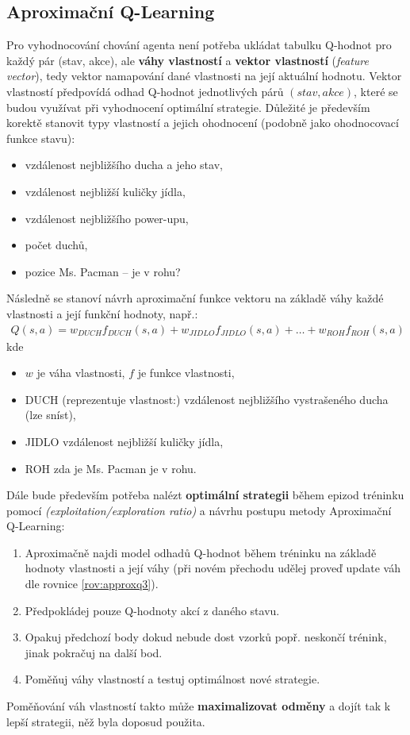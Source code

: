 \subsection*{Aproximační Q-Learning}
\label{navrh:approxqlearnagent}
Pro vyhodnocování chování agenta není potřeba ukládat tabulku Q-hodnot pro každý pár (stav, akce), ale \textbf{váhy vlastností} a \textbf{vektor vlastností} (\textit{feature vector}), tedy vektor namapování dané vlastnosti na její aktuální hodnotu.
Vektor vlastností předpovídá odhad Q-hodnot jednotlivých párů $(stav,akce)$, které se budou využívat při vyhodnocení optimální strategie. Důležité je především korektě stanovit typy vlastností a jejich ohodnocení (podobně jako ohodnocovací funkce stavu):
\begin{itemize}
\item vzdálenost nejbližšího ducha a jeho stav,
\item vzdálenost nejbližší kuličky jídla,
\item vzdálenost nejbližšího power-upu,
\item počet duchů,
\item pozice Ms. Pacman -- je v rohu?
\end{itemize}
Následně se stanoví návrh aproximační funkce vektoru na základě váhy každé vlastnosti a její funkční hodnoty, např.:
\begin{align}
Q(s,a) = w_{DUCH}f_{DUCH}(s,a) + w_{JIDLO}f_{JIDLO}(s,a) + \dots + w_{ROH}f_{ROH}(s,a)
\end{align}
kde 
\begin{itemize}
  \item $w$ je váha vlastnosti, $f$ je funkce vlastnosti,
  \item DUCH (reprezentuje vlastnost:) vzdálenost nejbližšího vystrašeného ducha (lze sníst),
  \item JIDLO vzdálenost nejbližší kuličky jídla,
  \item ROH zda je Ms. Pacman je v rohu.
\end{itemize}

Dále bude především potřeba nalézt \textbf{optimální strategii} během epizod tréninku pomocí \textit{(exploitation/exploration ratio)} a návrhu postupu metody Aproximační Q-Learning:
\begin{enumerate}
\item Aproximačně najdi model odhadů Q-hodnot během tréninku na základě hodnoty vlastnosti a její váhy (při novém přechodu udělej proveď update váh dle rovnice \ref{rov:approxq3}).
\item Předpokládej pouze Q-hodnoty akcí z daného stavu.
\item Opakuj předchozí body dokud nebude dost vzorků popř. neskončí trénink, jinak pokračuj na další bod.
\item Poměňuj váhy vlastností a testuj optimálnost nové strategie.
\end{enumerate}
Poměňování váh vlastností takto může \textbf{maximalizovat odměny} a dojít tak k lepší strategii, něž byla doposud použita.

